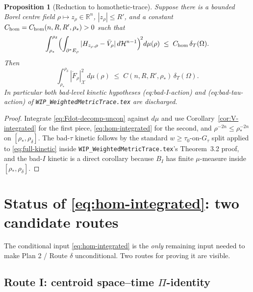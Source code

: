 \documentclass[11pt]{article}
\newtheorem{proposition}[theorem]{Proposition}
\theoremstyle{definition}
\newcommand{\R}{\mathbb{R}}
\newcommand{\Om}{\Omega}
\newcommand{\rstar}{\rho_{*}}
\newcommand{\rdel}{\rho_\delta}
\newcommand{\Hn}{\mathcal H^{n-1}}
\newcommand{\X}{\mathcal X}
\begin{document}
\begin{proposition}[Reduction to homothetic-trace]\label{prop:reduction}
Suppose there is a bounded Borel centre field
$\rho\mapsto z_\rho\in\R^{n}$, $|z_\rho|\le R'$, and a constant
$C_{\rm hom}=C_{\rm hom}(n,R,R',\rstar)>0$ such that
\begin{equation}\label{eq:hom-integrated}
   \int_{\rstar}^{\rdel}\Bigl(\int_{\partial^{*}E_\rho}|H_{z_\rho,\rho}-\bar V_\rho|\,d\Hn\Bigr)^{\!2}d\mu(\rho)
   \;\le\;C_{\rm hom}\,\delta_T(\Om).
\end{equation}
Then
\begin{equation}\label{eq:full-kinetic}
   \int_{\rstar}^{\rdel}|\dot F_\rho|_\X^{2}\,d\mu(\rho)
   \;\le\;C(n,R,R',\rstar)\,\delta_T(\Om).
\end{equation}
In particular both bad-level kinetic hypotheses
\textup{(eq:bad-I-action)} and \textup{(eq:bad-tau-action)} of
\texttt{WIP\_WeightedMetricTrace.tex} are discharged.
\end{proposition}

\begin{proof}
Integrate \eqref{eq:Fdot-decomp-uncon} against $d\mu$ and use
Corollary~\ref{cor:V-integrated} for the first piece,
\eqref{eq:hom-integrated} for the second, and
$\rho^{-2n}\le\rstar^{-2n}$ on $[\rstar,\rdel]$.
The bad-$\tau$ kinetic follows by the standard
$w\ge\tau_0$-on-$G_\tau$ split applied to \eqref{eq:full-kinetic}
inside \texttt{WIP\_WeightedMetricTrace.tex}'s Theorem~3.2 proof, and
the bad-$I$ kinetic is a direct corollary because $B_I$ has
finite $\mu$-measure inside $[\rstar,\rdel]$.
\end{proof}

\section{Status of \eqref{eq:hom-integrated}: two candidate routes}
\label{sec:routes}

The conditional input \eqref{eq:hom-integrated} is the
\emph{only} remaining input needed to make Plan 2 / Route $\delta$
unconditional.  Two routes for proving it are visible.

\subsection{Route I: centroid space--time $\Pi$-identity}
\end{document}
